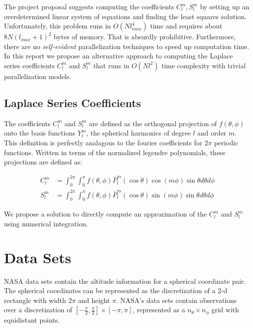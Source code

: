 \documentclass[a4paper]{article}
\theoremstyle{definition}
\begin{document}
The project proposal suggests computing the coefficients $C_l^m, S_l^m$ by setting up an overdetermined linear system of equations and finding the least squares
solution. Unfortunately, this problem runs in $O(Nl_{max}^4)$ time and requires about $8N(l_{max} + 1)^2$ bytes of memory. That is absurdly prohibitive. Furthermore, there 
are no \textit{self-evident} parallelization techniques to speed up computation time. In this report we propose an alternative approach to computing the Laplace series coefficients
$C_l^m$ and $S_l^m$ that runs in \textbf{$O(Nl^2)$} time complexity with trivial parallelization models.

\subsection{Laplace Series Coefficients}

The coefficients $C_l^m$ and $S_l^m$ are defined as the orthogonal projection of $f(\theta, \phi)$ onto the basis functions $Y_l^m$, 
the spherical harmonics of degree $l$ and order $m$. This definition is perfectly analagous to the fourier coefficients for $2\pi$ 
periodic functions. Written in terms of the normalized legendre polynomials, these projections are defined as:

\begin{align*}
    \label{eq:coeff}
    C_l^m &= \int_0^{2\pi}\int_0^\pi f(\theta, \phi) \bar P_l^m (\cos \theta)\cos (m \phi) \sin \theta d\theta d\phi\\
    S_l^m &= \int_0^{2\pi}\int_0^\pi f(\theta, \phi) \bar P_l^m (\cos \theta)\sin (m \phi) \sin \theta d\theta d\phi 
\end{align*}

We propose a solution to directly compute an approximation of the $C_l^m$ and $S_l^m$ using numerical integration.

\newpage

\section{Data Sets}

NASA data sets contain the altitude information for a spherical coordinate pair. The spherical coordinates can
be represented as the discretization of a 2-d rectangle with width $2\pi$ and height $\pi$. NASA's data sets contain observations
over a discretization of $[-\frac{\pi}{2}, \frac{\pi}{2}] \times [-\pi, \pi]$, represented as a $n_\theta \times n_\phi$ grid with equidistant points.
\end{document}
